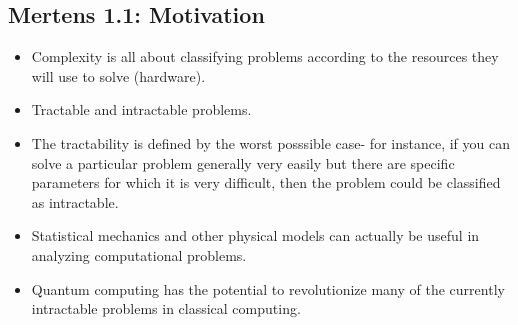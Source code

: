 \documentclass{article}
\begin{document}
\subsection{Mertens 1.1: Motivation}
\begin{itemize}
    \item Complexity is all about classifying problems according to the resources they will use to solve (hardware).
    \item Tractable and intractable problems.
    \item The tractability is defined by the worst posssible case- for instance, if you can solve a particular problem generally very easily but there are specific parameters for which it is very difficult, then the problem could be classified as intractable.
    \item Statistical mechanics and other physical models can actually be useful in analyzing computational problems.
    \item Quantum computing has the potential to revolutionize many of the currently intractable problems in classical computing.
\end{itemize}
\end{document}
